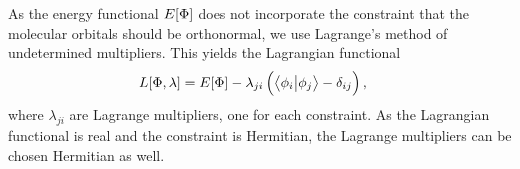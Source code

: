             As the energy functional $E[\Phi]$ does not incorporate
            the constraint that the molecular orbitals should be orthonormal, we
            use Lagrange's method of undetermined multipliers.
            This yields the Lagrangian functional
            \begin{align}
                L[\Phi, \lambda]
                &= E[\Phi]
                - \lambda_{ji}\left( 
                    \braket{\phi_i}{\phi_j}
                    - \delta_{ij}
                 \right),
            \end{align}
            where $\lambda_{ji}$ are Lagrange multipliers, one for each
            constraint.
            As the Lagrangian functional is real and the constraint is
            Hermitian, the Lagrange multipliers can be chosen Hermitian as well.

